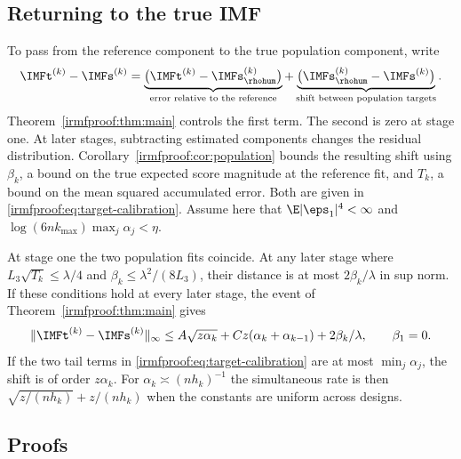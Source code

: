 \subsection{Returning to the true IMF}\label{irmfproof:sec:targets}

To pass from the reference component to the true population component, write
\[
 \IMFt^{(k)}-\IMFs^{(k)}
 =\underbrace{\bigl(\IMFt^{(k)}-\IMFs_{\rhohum}^{(k)}\bigr)}_{\text{error relative to the reference}}
 +\underbrace{\bigl(\IMFs_{\rhohum}^{(k)}-\IMFs^{(k)}\bigr)}_{\text{shift between population targets}} .
\]
Theorem~\ref{irmfproof:thm:main} controls the first term. The second is zero
at stage one. At later stages, subtracting estimated components changes the
residual distribution. Corollary~\ref{irmfproof:cor:population} bounds the
resulting shift using \(\beta_k\), a bound on the true expected score magnitude
at the reference fit, and \(T_k\), a bound on the mean squared accumulated error.
Both are given in \eqref{irmfproof:eq:target-calibration}.
Assume here that \(\E|\eps_1|^4<\infty\)
and \(\log(6n k_{\max})\max_j\alpha_j<\eta\).

\begin{corollary}\label{irmfproof:cor:population}
At stage one the two population fits coincide. At any later stage where
\(L_3\sqrt{T_k}\le\lambda/4\) and \(\beta_k\le\lambda^2/(8L_3)\), their
distance is at most \(2\beta_k/\lambda\) in sup norm. If these conditions
hold at every later stage, the event of Theorem~\ref{irmfproof:thm:main} gives
\[
 \|\IMFt^{(k)}-\IMFs^{(k)}\|_\infty
 \le A\sqrt{z\alpha_k}+Cz(\alpha_k+\alpha_{k-1})+2\beta_k/\lambda,
 \qquad \beta_1=0 .
\]
If the two tail terms in \eqref{irmfproof:eq:target-calibration} are at most
\(\min_j\alpha_j\), the shift is of order \(z\alpha_k\). For
\(\alpha_k\asymp(nh_k)^{-1}\) the simultaneous rate is then
\(\sqrt{z/(nh_k)}+z/(nh_k)\) when the constants are uniform across designs.
\end{corollary}

\subsection{Proofs}

